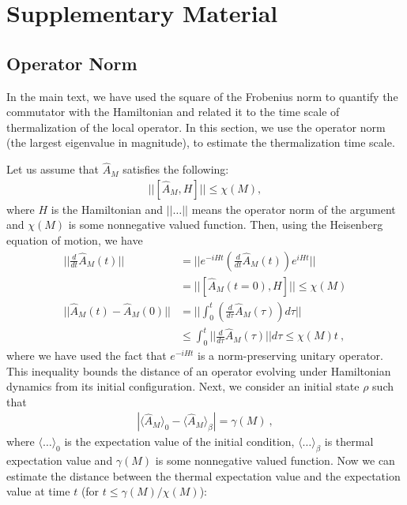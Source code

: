 \documentclass[twocolumn,superscriptaddress, prb]{revtex4-1}
\begin{document}


\newpage
\section*{Supplementary Material}

\subsection{Operator Norm}
In the main text, we have used the square of the Frobenius norm to quantify the commutator with the Hamiltonian
and related it to the time scale of thermalization of the local operator.
In this section, we use the operator norm (the largest eigenvalue in magnitude),
to estimate the thermalization time scale.


Let us assume that $\hat{A}_M$ satisfies the following:
\begin{align}
||[\hat{A}_M, H]|| \leq \chi(M),
\end{align}
where $H$ is the Hamiltonian and $||\ldots||$ means the operator norm of the argument and $\chi(M)$ is some nonnegative valued function.
Then, using the Heisenberg equation of motion, we have
\begin{align}
\bigg|\bigg|\frac{d}{dt} \hat{A}_M(t)\bigg|\bigg| &= \bigg|\bigg| e^{-i H t} \left(\frac{d}{dt} \hat{A}_M (t)\right) e^{i H t} \bigg|\bigg| \nonumber\\
&= ||[\hat{A}_M(t = 0), H]|| \leq \chi(M) \\
||\hat{A}_M(t) - \hat{A}_M(0)|| &= \bigg|\bigg|\int_0^t \left(\frac{d}{d\tau} \hat{A}_M(\tau)\right)d\tau \bigg|\bigg| \nonumber\\
&\leq \int^t_0 \big|\big|\frac{d}{d\tau} \hat{A}_M(\tau)\big|\big|d\tau \leq \chi(M) t ~,
\end{align}
where we have used the fact that $e^{-iHt}$ is a norm-preserving unitary operator.
This inequality bounds the distance of an operator evolving under Hamiltonian dynamics
from its initial configuration. Next, we consider an initial state $\rho$ such that
\begin{align}
|\langle \hat{A}_M \rangle_0 - \langle \hat{A}_M \rangle_\beta| = \gamma(M) ~,
\end{align}
where $\langle \ldots \rangle_0$ is the expectation value of the initial condition, $\langle \ldots \rangle_\beta$
is thermal expectation value and $\gamma(M)$ is some nonnegative valued function.
Now we can estimate the distance between the thermal expectation value and the expectation value at time $t$ (for $t \leq \gamma(M)/\chi(M)$):
\end{document}
